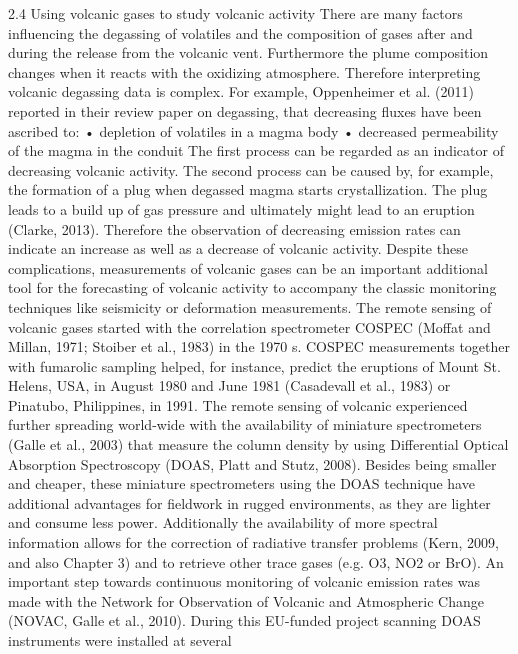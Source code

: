\documentclass  [
  paper    = a4,
  BCOR     = 10mm,
  twoside,
  fontsize = 12pt,
  fleqn,
  toc      = bibnumbered,
  toc      = listofnumbered,
  numbers  = noendperiod,
  headings = normal,
  listof   = leveldown,
  version  = 3.03
]                                       {scrreprt}
\begin{document}
	2.4 Using volcanic gases to study volcanic activity
	There are many factors influencing the degassing of volatiles and the composition
	of gases after and during the release from the volcanic vent. Furthermore the
	plume composition changes when it reacts with the oxidizing atmosphere. Therefore
	interpreting volcanic degassing data is complex. For example, Oppenheimer
	et al. (2011) reported in their review paper on  degassing, that decreasing
	 fluxes have been ascribed to:
	• depletion of volatiles in a magma body
	• decreased permeability of the magma in the conduit
	The first process can be regarded as an indicator of decreasing volcanic activity.
	The second process can be caused by, for example, the formation of a plug when
	degassed magma starts crystallization. The plug leads to a build up of gas
	pressure and ultimately might lead to an eruption (Clarke, 2013). Therefore the
	observation of decreasing  emission rates can indicate an increase as well as
	a decrease of volcanic activity.
	Despite these complications, measurements of volcanic gases can be an important
	additional tool for the forecasting of volcanic activity to accompany
	the classic monitoring techniques like seismicity or deformation measurements.
	The remote sensing of volcanic gases started with the correlation spectrometer
	COSPEC (Moffat and Millan, 1971; Stoiber et al., 1983) in the 1970 s. COSPEC 
	measurements together with fumarolic sampling helped, for instance, predict the
	eruptions of Mount St. Helens, USA, in August 1980 and June 1981 (Casadevall
	et al., 1983) or Pinatubo, Philippines, in 1991. The remote sensing of volcanic
	 experienced further spreading world-wide with the availability of miniature
	spectrometers (Galle et al., 2003) that measure the  column density by
	using Differential Optical Absorption Spectroscopy (DOAS, Platt and Stutz,
	2008). Besides being smaller and cheaper, these miniature spectrometers using
	the DOAS technique have additional advantages for fieldwork in rugged
	environments, as they are lighter and consume less power. Additionally the
	availability of more spectral information allows for the correction of radiative
	transfer problems (Kern, 2009, and also Chapter 3) and to retrieve other trace
	gases (e.g. O3, NO2 or BrO). An important step towards continuous monitoring
	of volcanic  emission rates was made with the Network for Observation
	of Volcanic and Atmospheric Change (NOVAC, Galle et al., 2010). During
	this EU-funded project scanning DOAS instruments were installed at several
\end{document}
